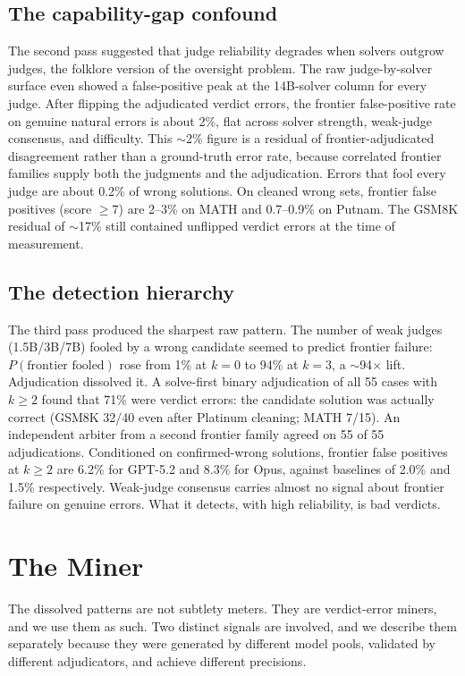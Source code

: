 \documentclass[11pt]{article}
\begin{document}
\subsection{The capability-gap confound}
\label{sec:capgap}

The second pass suggested that judge reliability degrades when solvers outgrow judges, the folklore version of the oversight problem.
The raw judge-by-solver surface even showed a false-positive peak at the 14B-solver column for every judge.
After flipping the adjudicated verdict errors, the frontier false-positive rate on genuine natural errors is about 2\%, flat across solver strength, weak-judge consensus, and difficulty.
This $\sim$2\% figure is a residual of frontier-adjudicated disagreement rather than a ground-truth error rate, because correlated frontier families supply both the judgments and the adjudication.
Errors that fool every judge are about 0.2\% of wrong solutions.
On cleaned wrong sets, frontier false positives (score $\ge 7$) are 2--3\% on MATH and 0.7--0.9\% on Putnam.
The GSM8K residual of $\sim$17\% still contained unflipped verdict errors at the time of measurement.

\subsection{The detection hierarchy}

The third pass produced the sharpest raw pattern.
The number of weak judges (1.5B/3B/7B) fooled by a wrong candidate seemed to predict frontier failure: $P(\text{frontier fooled})$ rose from 1\% at $k=0$ to 94\% at $k=3$, a $\sim$94$\times$ lift.
Adjudication dissolved it.
A solve-first binary adjudication of all 55 cases with $k\ge2$ found that 71\% were verdict errors: the candidate solution was actually correct (GSM8K 32/40 even after Platinum cleaning; MATH 7/15).
An independent arbiter from a second frontier family agreed on 55 of 55 adjudications.
Conditioned on confirmed-wrong solutions, frontier false positives at $k\ge2$ are 6.2\% for GPT-5.2 and 8.3\% for Opus, against baselines of 2.0\% and 1.5\% respectively.
Weak-judge consensus carries almost no signal about frontier failure on genuine errors.
What it detects, with high reliability, is bad verdicts.

\section{The Miner}
\label{sec:miner}

The dissolved patterns are not subtlety meters.
They are verdict-error miners, and we use them as such.
Two distinct signals are involved, and we describe them separately because they were generated by different model pools, validated by different adjudicators, and achieve different precisions.
\end{document}
